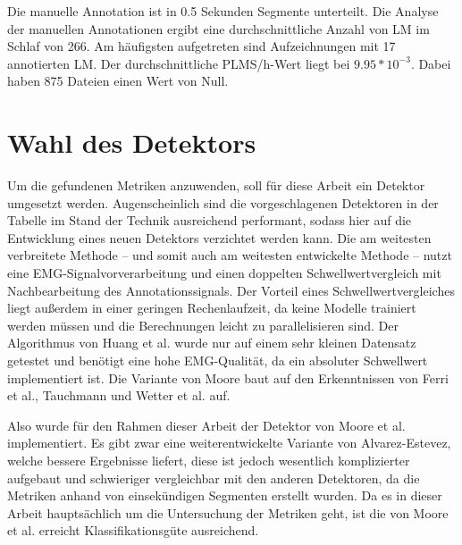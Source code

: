 Die manuelle Annotation ist in 0.5 Sekunden Segmente unterteilt. Die Analyse der manuellen Annotationen ergibt eine durchschnittliche Anzahl von LM im Schlaf von 266. Am häufigsten aufgetreten sind Aufzeichnungen mit 17 annotierten LM. Der durchschnittliche PLMS/h-Wert liegt bei $9.95 * 10^{-3}$. Dabei haben 875 Dateien einen Wert von Null.

\section{Wahl des Detektors}\label{chap:WahldesDetektors}
Um die gefundenen Metriken anzuwenden, soll für diese Arbeit ein Detektor umgesetzt werden. 
Augenscheinlich sind die vorgeschlagenen Detektoren in der Tabelle im Stand der Technik ausreichend performant, sodass hier auf die Entwicklung eines neuen Detektors verzichtet werden kann.
Die am weitesten verbreitete Methode – und somit auch am weitesten entwickelte Methode – nutzt eine EMG-Signalvorverarbeitung und einen doppelten Schwellwertvergleich mit Nachbearbeitung des Annotationssignals. Der Vorteil eines Schwellwertvergleiches liegt außerdem in einer geringen Rechenlaufzeit, da keine Modelle trainiert werden müssen und die Berechnungen leicht zu parallelisieren sind. 
Der Algorithmus von Huang et al. wurde nur auf einem sehr kleinen Datensatz getestet und benötigt eine hohe EMG-Qualität, da ein absoluter Schwellwert implementiert ist. Die Variante von Moore baut auf den Erkenntnissen von Ferri et al., Tauchmann und Wetter et al. auf. 

Also wurde für den Rahmen dieser Arbeit der Detektor von Moore et al. implementiert. Es gibt zwar eine weiterentwickelte Variante von Alvarez-Estevez, welche bessere Ergebnisse liefert, diese ist jedoch wesentlich komplizierter aufgebaut und schwieriger vergleichbar mit den anderen Detektoren, da die Metriken anhand von einsekündigen Segmenten erstellt wurden. 
Da es in dieser Arbeit hauptsächlich um die Untersuchung der Metriken geht, ist die von Moore et al. erreicht Klassifikationsgüte ausreichend. 

